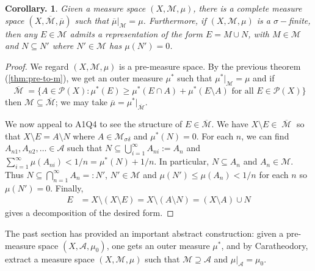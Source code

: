 \documentclass[11pt, a4paper]{memoir}
\newcommand{\ol}[1]{\ensuremath{\overline{#1}}}
\theoremstyle{change}
\newtheorem{corollary}[theorem]{Corollary.}
\theoremstyle{plain}
\theoremstyle{nonumberplain}
\newtheorem{proof}{Proof}
\DeclareMathOperator{\M}{{\mathcal{M}}}
\numberwithin{equation}{section}
\begin{document}
\begin{corollary}
    Given a measure space $(X,\mathcal{M},\mu)$, there is a complete measure space $(X,\ol{\mathcal{M}},\ol{\mu})$ such that $\ol{\mu}|_{\mathcal{M}}=\mu$.
    Furthermore, if $(X,\mathcal{M},\mu)$ is a $\sigma-$finite, then any $E\in\mathcal{M}$ admits a representation of the form $E=M\cup N$, with $M\in\mathcal{M}$ and $N\subseteq N'$ where $N'\in\mathcal{M}$ has $\mu(N')=0$.
\end{corollary}
\begin{proof}
    We regard $(X,\mathcal{M},\mu)$ is a pre-measure space.
    By the previous theorem (\cref{thm:pre-to-m}), we get an outer measure $\mu^*$ such that $\mu^*|_{\mathcal{M}}=\mu$ and if
    \begin{equation*}
        \ol{\M}=\{A\in\mathcal{P}(X):\mu^*(E)\geq\mu^*(E\cap A)+\mu^*(E\setminus A)\text{ for all }E\in\mathcal{P}(X)\}
    \end{equation*}
    then $\mathcal{M}\subseteq\ol{\mathcal{M}}$; we may take $\ol{\mu}=\mu^*|_{\ol{\mathcal{M}}}$.

    We now appeal to A1Q4 to see the structure of $E\in\ol{\mathcal{M}}$.
    We have $X\setminus E\in\ol{\M}$ so that $X\setminus E=A\setminus N$ where $A\in\mathcal{M}_{\sigma\delta}$ and $\mu^*(N)=0$.
    For each $n$, we can find $A_{n1},A_{n2},\ldots\in\mathcal{A}$ such that $N\subseteq\bigcup_{i=1}^\infty A_{ni}:=A_n$ and $\sum_{i=1}^\infty \mu(A_{ni})<1/n=\mu^*(N)+1/n$.
    In particular, $N\subseteq A_n$ and $A_n\in\mathcal{M}$.
    Thus $N\subseteq\bigcap_{n=1}^\infty A_n=:N'$, $N'\in\mathcal{M}$ and $\mu(N')\leq\mu(A_n)<1/n$ for each $n$ so $\mu(N')=0$.
    Finally,
    \begin{align*}
        E&=X\setminus(X\setminus E)=X\setminus(A\setminus N)=(X\setminus A)\cup N
    \end{align*}
    gives a decomposition of the desired form.
\end{proof}
The past section has provided an important abstract construction: given a pre-measure space $(X,\mathcal{A},\mu_0)$, one gets an outer measure $\mu^*$, and by Caratheodory, extract a measure space $(X,\mathcal{M},\mu)$ such that $\mathcal{M}\supseteq\mathcal{A}$ and $\mu|_{\mathcal{A}}=\mu_0$.
\end{document}

